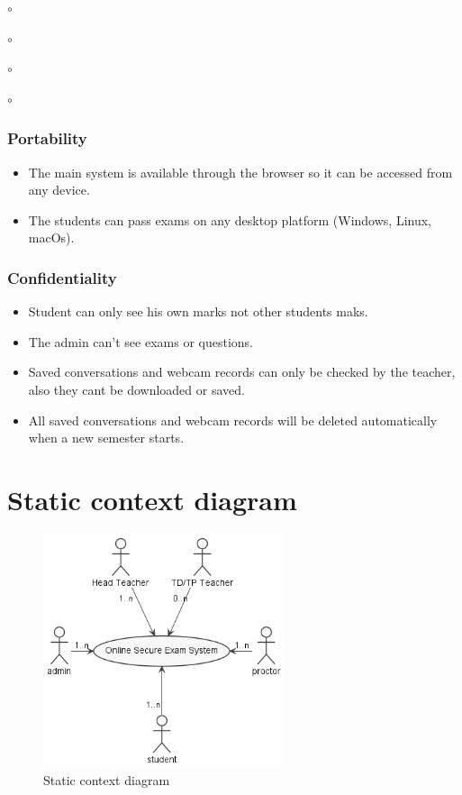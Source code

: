 \documentclass[]{uc2pfecaneva}
\begin{document}
\begin{list}{$\circ$}{}
\begin{list}{$\circ$}{}
\begin{list}{$\circ$}{}
\begin{list}{$\circ$}{}
    \raggedright\subsubsection{Portability}
    \begin{itemize}
        \item The main system is available through the browser so it can be accessed from any device.
        \item The students can pass exams on any desktop platform (Windows, Linux, macOs).
    \end{itemize}

    \raggedright\subsubsection{Confidentiality}
    \begin{itemize}
        \item Student can only see his own marks not other students maks.
        \item The admin can’t see exams or questions.
        \item Saved conversations and webcam records can only be checked by the teacher, also they cant be downloaded or saved.
        \item All saved conversations and webcam records will be deleted automatically when a new semester starts.
    \end{itemize}

    \raggedright\section{Static context diagram}
    \begin{figure}[h]

        \centering
        \includegraphics[width=200pt]{images/SCD}
        \caption{Static context diagram}
    \end{figure}



\end{list}
\end{list}
\end{list}
\end{list}
\end{document}
